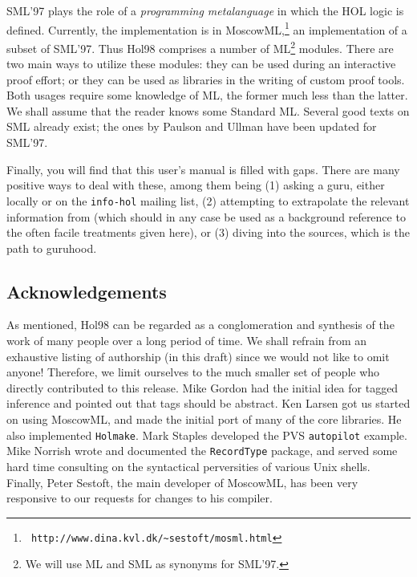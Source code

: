 \documentclass[12pt,fleqn,a4paper]{report}
\begin{document}

SML'97 \cite{SML97} plays the role of a {\it programming metalanguage\/}
 in which the HOL logic is defined. Currently, the implementation is in
 MoscowML,\footnote{\tt
 http://www.dina.kvl.dk/\~{}sestoft/mosml.html}
 an implementation of a subset of SML'97.  Thus Hol98 comprises a number
 of ML\footnote{We will use ML and SML as synonyms for SML'97.}
 modules. There are two main ways to utilize these modules: they can be
 used during an interactive proof effort; or they can be used as
 libraries in the writing of custom proof tools.  Both usages require
 some knowledge of ML, the former much less than the latter. We shall
 assume that the reader knows some Standard ML. Several good texts on
 SML already exist; the ones by Paulson \cite{lcp:ml} and Ullman
 \cite{ullman:mlbook} have been updated for SML'97.

 Finally, you will find that this user's manual is filled with
 gaps. There are many positive ways to deal with these, among them being
 (1) asking a guru, either locally or on the \verb+info-hol+ mailing
 list, (2) attempting to extrapolate the relevant information from
 \cite{hol88:book} (which should in any case be used as a background
 reference to the often facile treatments given here), or (3) diving
 into the sources, which is the path to guruhood.

\subsection*{Acknowledgements}

As mentioned, Hol98 can be regarded as a conglomeration and synthesis of
the work of many people over a long period of time. We shall refrain
from an exhaustive listing of authorship (in this draft) since we would
not like to omit anyone! Therefore, we limit ourselves to the much
smaller set of people who directly contributed to this release.  Mike
Gordon had the initial idea for tagged inference and pointed out that
tags should be abstract. Ken Larsen got us started on using MoscowML,
and made the initial port of many of the core libraries. He also
implemented \verb+Holmake+. Mark Staples developed the PVS
\verb+autopilot+ example. Mike Norrish wrote and documented the
\verb+RecordType+ package, and served some hard time consulting on the
syntactical perversities of various Unix shells. Finally, Peter Sestoft,
the main developer of MoscowML, has been very responsive to our requests
for changes to his compiler.
\end{document}
